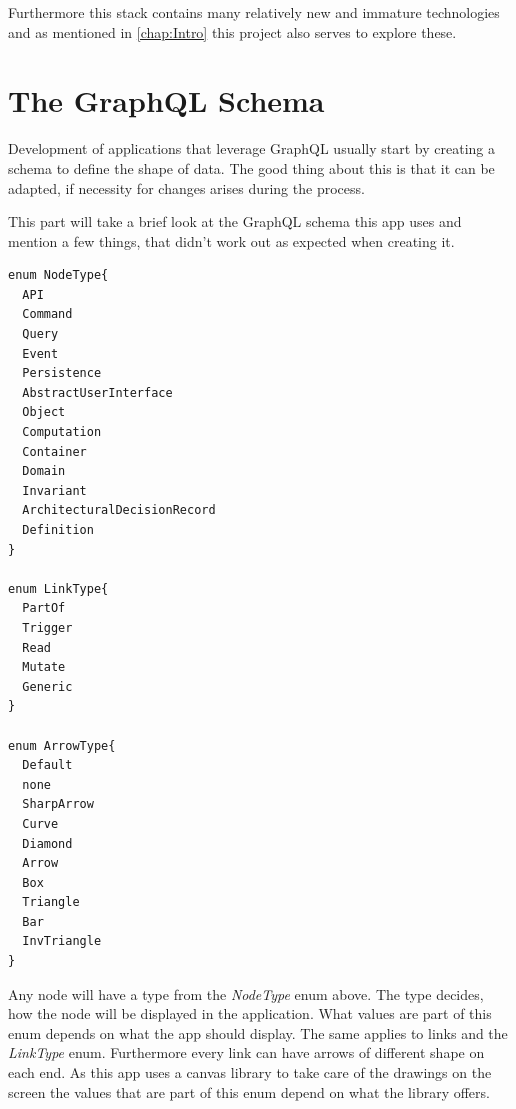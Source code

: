 Furthermore this stack contains many relatively new and immature technologies and as mentioned in \autoref{chap:Intro} this project also serves to explore these.

\section{The GraphQL Schema}
Development of applications that leverage GraphQL usually start by creating a schema to define the shape of data. The good thing about this is that it can be adapted, if necessity for changes arises during the process.

This part will take a brief look at the GraphQL schema this app uses and mention a few things, that didn't work out as expected when creating it.
\lstset{language=GraphQL}
\begin{lstlisting}[caption={GraphQL Enums},label={enums}]
enum NodeType{
  API
  Command
  Query
  Event
  Persistence
  AbstractUserInterface
  Object
  Computation
  Container
  Domain
  Invariant
  ArchitecturalDecisionRecord
  Definition
}

enum LinkType{
  PartOf
  Trigger
  Read
  Mutate
  Generic
}

enum ArrowType{
  Default
  none
  SharpArrow
  Curve
  Diamond
  Arrow
  Box
  Triangle
  Bar
  InvTriangle
}
\end{lstlisting}
\newpage
Any node will have a type from the \emph{NodeType} enum above. The type decides, how the node will be displayed in the application. What values are part of this enum depends on what the app should display. The same applies to links and the \emph{LinkType} enum. Furthermore every link can have arrows of different shape on each end. As this app uses a canvas library to take care of the drawings on the screen the values that are part of this enum depend on what the library offers.

